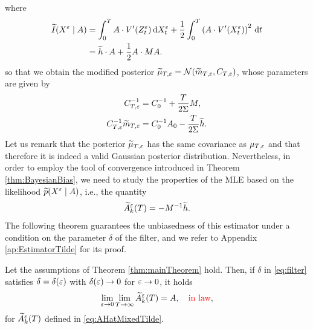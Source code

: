 \documentclass[10pt]{article}
\begin{document}
where 
\begin{equation}
\begin{aligned}
	\widetilde I(X^\varepsilon \mid A) & = \int_0^T A \cdot V'(Z^\varepsilon_t) \,\mathrm{d} X^\varepsilon_t + \frac12 \int_0^T \left(A \cdot V'(X^\varepsilon_t)\right)^2 \,\mathrm{d} t \\
	&= \widetilde h \cdot A + \frac12 A \cdot M A.
\end{aligned}
\end{equation}
so that we obtain the modified posterior $\widetilde \mu_{T,\varepsilon} = \mathcal N(\widetilde m_{T, \varepsilon}, C_{T, \varepsilon})$, whose parameters are given by
\begin{equation}
\begin{aligned}
	C_{T, \varepsilon}^{-1} &= C_0^{-1} + \frac{T}{2\Sigma} M, \\
	C_{T,\varepsilon}^{-1}\widetilde m_{T,\varepsilon} &= C_0^{-1}A_0 - \frac{T}{2\Sigma} \widetilde h. 
\end{aligned}	
\end{equation}
Let us remark that the posterior $\widetilde \mu_{T,\varepsilon}$ has the same covariance as $\mu_{T,\varepsilon}$ and that therefore it is indeed a valid Gaussian posterior distribution. Nevertheless, in order to employ the tool of convergence introduced in Theorem \ref{thm:BayesianBias}, we need to study the properties of the MLE based on the likelihood $\widetilde p(X^\varepsilon \mid A)$, i.e., the quantity
\begin{equation}\label{eq:AHatMixedTilde}
	\widetilde A^\varepsilon_k(T) = - M^{-1} \widetilde h.
\end{equation}
The following theorem guarantees the unbiasedness of this estimator under a condition on the parameter $\delta$ of the filter, and we refer to Appendix \ref{ap:EstimatorTilde} for its proof.
\begin{theorem}\label{thm:mainTheoremTilde} Let the assumptions of Theorem \ref{thm:mainTheorem} hold. Then, if $\delta$ in \eqref{eq:filter} satisfies $\delta = \delta(\varepsilon)$ with $\delta(\varepsilon) \to 0$ for $\varepsilon \to 0$, it holds
	\begin{equation}
	\lim_{\varepsilon \to 0} \lim_{T \to \infty} \widetilde A^\varepsilon_k(T) = A, \quad {\color{red}\text{in law}},
	\end{equation} 
	for $\widetilde A^\varepsilon_k(T)$ defined in \eqref{eq:AHatMixedTilde}.
\end{theorem}
\end{document}

